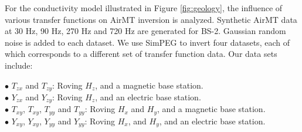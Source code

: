 \documentclass{segabs}
\begin{document}
For the conductivity model illustrated in Figure \ref{fig:geology}, the influence of various transfer functions on AirMT inversion is analyzed. Synthetic AirMT data at 30 Hz, 90 Hz, 270 Hz and 720 Hz are generated for BS-2. Gaussian random noise is added to each dataset. We use SimPEG \citep{Cockett2015} to invert four datasets, each of which corresponds to a different set of transfer function data. Our data sets include:

$\bullet$ $T_{zx}$ and $T_{zy}$: Roving $H_z$, and a magnetic base station.\\
$\bullet$ $Y_{zx}$ and $Y_{zy}$: Roving $H_z$, and an electric base station.\\
$\bullet$ $T_{xy}$, $T_{xy}$, $T_{yy}$ and $T_{yy}$: Roving $H_x$ and $H_y$, and a magnetic base station. \\
$\bullet$ $Y_{xy}$, $Y_{xy}$, $Y_{yy}$ and $Y_{yy}$: Roving $H_x$, and $H_y$, and an electric base station.
\end{document}
